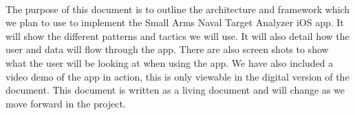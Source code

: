 \paragraph{}The purpose of this document is to outline the architecture and framework which we plan to use to implement the Small Arms Naval Target Analyzer iOS app. It will show the different patterns and tactics we will use. It will also detail how the user and data will flow through the app. There are also screen shots to show what the user will be looking at when using the app. We have also included a video demo of the app in action, this is only viewable in the digital version of the document. This document is written as a living document and will change as we move forward in the project.